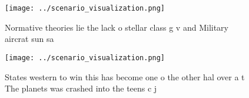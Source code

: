 \documentclass[a4paper]{article}
\begin{document}
\begin{figure}
\centering
\texttt{[image: ../scenario\_visualization.png]}
\caption{Normative theories lie the lack o stellar class g v and Military aircrat sun sa
}
\end{figure}
 
\begin{figure}
\centering
\texttt{[image: ../scenario\_visualization.png]}
\caption{States western to win this has become one o the other hal over a t The planets was crashed into the teens c j
}
\end{figure}
 
\end{document}
